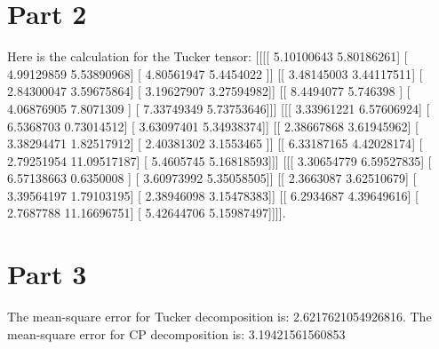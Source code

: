 \documentclass{article}%
\begin{document}
\section{Part 2}%
\label{sec:Part2}%
Here is the calculation for the Tucker tensor: {[}{[}{[}{[} 5.10100643  5.80186261{]}\newline%
   {[} 4.99129859  5.53890968{]}\newline%
   {[} 4.80561947  5.4454022 {]}{]}\newline%
\newline%
  {[}{[} 3.48145003  3.44117511{]}\newline%
   {[} 2.84300047  3.59675864{]}\newline%
   {[} 3.19627907  3.27594982{]}{]}\newline%
\newline%
  {[}{[} 8.4494077   5.746398  {]}\newline%
   {[} 4.06876905  7.8071309 {]}\newline%
   {[} 7.33749349  5.73753646{]}{]}{]}\newline%
\newline%
\newline%
 {[}{[}{[} 3.33961221  6.57606924{]}\newline%
   {[} 6.5368703   0.73014512{]}\newline%
   {[} 3.63097401  5.34938374{]}{]}\newline%
\newline%
  {[}{[} 2.38667868  3.61945962{]}\newline%
   {[} 3.38294471  1.82517912{]}\newline%
   {[} 2.40381302  3.1553465 {]}{]}\newline%
\newline%
  {[}{[} 6.33187165  4.42028174{]}\newline%
   {[} 2.79251954 11.09517187{]}\newline%
   {[} 5.4605745   5.16818593{]}{]}{]}\newline%
\newline%
\newline%
 {[}{[}{[} 3.30654779  6.59527835{]}\newline%
   {[} 6.57138663  0.6350008 {]}\newline%
   {[} 3.60973992  5.35058505{]}{]}\newline%
\newline%
  {[}{[} 2.3663087   3.62510679{]}\newline%
   {[} 3.39564197  1.79103195{]}\newline%
   {[} 2.38946098  3.15478383{]}{]}\newline%
\newline%
  {[}{[} 6.2934687   4.39649616{]}\newline%
   {[} 2.7687788  11.16696751{]}\newline%
   {[} 5.42644706  5.15987497{]}{]}{]}{]}.\newline%
\newline%

%
\section{Part 3}%
\label{sec:Part3}%
The mean{-}square error for Tucker decomposition is: 2.6217621054926816.\newline%
\newline%
%
The mean{-}square error for CP decomposition is: 3.19421561560853\newline%
\newline%

%
\end{document}
